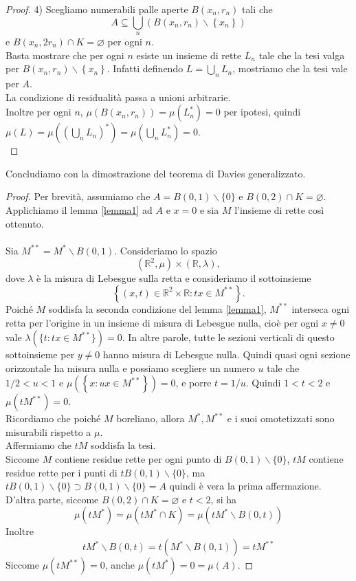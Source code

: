 \documentclass[a4paper, twoside,openright]{article}
\newcommand{\<}{\langle}
\renewcommand{\>}{\rangle}
\begin{document}
\begin{proof}
	4) Scegliamo numerabili palle aperte $B\left(x_{n}, r_{n}\right)$ tali che
	$$ A \subseteq \bigcup_{n}\left(B\left(x_{n}, r_{n}\right) \backslash\left\{x_{n}\right\}\right)$$
	e $B\left(x_{n}, 2 r_{n}\right) \cap K=\varnothing$ per ogni $n$.\\
	Basta mostrare che per ogni $n$ esiste un insieme di rette $L_{n}$ tale che la tesi valga per $B\left(x_{n}, r_{n}\right) \backslash\left\{x_{n}\right\}$. Infatti definendo $L=\bigcup_n L_n$, mostriamo che la tesi vale per $A$.\\
	La condizione di residualità passa a unioni arbitrarie.\\
	Inoltre per ogni $n$, $\mu(B(x_n,r_n))=\mu(L_n^*)=0$ per ipotesi, quindi $\mu(L)=\mu((\bigcup_nL_n)^*) = \mu(\bigcup_n L_n^*)=0$.\\
	
	\end{proof}

Concludiamo con la dimostrazione del teorema di Davies generalizzato.

\begin{proof}
	
Per brevità, assumiamo che $A=B(0,1) \backslash\{0\}$ e $B(0,2) \cap K=\varnothing$. Applichiamo il lemma \ref{lemma1} ad $A$ e $x=0$ e sia $M$ l'insieme di rette così ottenuto.\\
\hfill \\
Sia $M^{* *}=M^{*} \backslash B(0,1)$. Consideriamo lo spazio
$$
\left(\mathbb{R}^{2}, \mu\right) \times(\mathbb{R}, \lambda),
$$
dove $\lambda$ è la misura di Lebesgue sulla retta e consideriamo il sottoinsieme
$$
\left\{(x, t) \in \mathbb{R}^{2} \times \mathbb{R}: t x \in M^{* *}\right\} .
$$
Poiché $M$ soddisfa la seconda condizione del lemma \ref{lemma1}, $M^{**}$ interseca ogni retta per l'origine in un insieme di misura di Lebesgue nulla, cioè per ogni $x \neq 0$ vale $\lambda(\{t: tx \in M^{**}\})=0$. In altre parole, tutte le sezioni verticali di questo sottoinsieme per $y\neq 0$  hanno misura di Lebesgue nulla. Quindi quasi ogni sezione orizzontale ha misura nulla e possiamo scegliere un numero $u$ tale che $1 / 2<u<1$ e $\mu\left(\left\{x: u x \in M^{* *}\right\}\right)=0$, e porre $t=1 / u$. Quindi $1<t<2$ e $\mu\left(t M^{* *}\right)=0$.\\
Ricordiamo che poiché $M$ boreliano, allora $M^*, M^{**}$ e i suoi omotetizzati sono misurabili rispetto a $\mu$.\\
Affermiamo che $t M$ soddisfa la tesi.\\
Siccome $M$ contiene residue rette per ogni punto di $B(0,1) \backslash\{0\}$, $t M$ contiene residue rette per i punti di $t B(0,1) \backslash\{0\}$, ma $t B(0,1) \backslash\{0\} \supset B(0,1) \backslash\{0\}=A$ quindi è vera la prima affermazione.\\
D'altra parte, siccome $B(0,2) \cap K=\varnothing$ e $t<2$, si ha
$$
\mu\left(t M^{*}\right)=\mu\left(t M^{*} \cap K\right)=\mu\left(t M^{*} \backslash B(0, t)\right)
$$
Inoltre
$$
t M^{*} \backslash B(0, t)=t\left(M^{*} \backslash B(0,1)\right)=t M^{* *}
$$
Siccome $\mu\left(t M^{* *}\right)=0$, anche $\mu (tM^*)= 0= \mu(A)$.

\end{proof}
\end{document}
